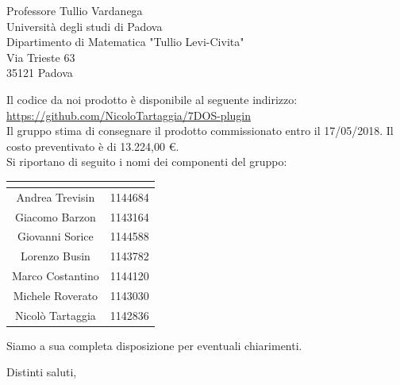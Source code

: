 \begin{letter}{Professore Tullio Vardanega \\ Università degli studi di Padova \\ Dipartimento di Matematica "Tullio Levi-Civita" \\ Via Trieste 63 \\ 35121 Padova}
\begin{addmargin}[2em]{2em}
	Il codice da noi prodotto è disponibile al seguente indirizzo:\\[0.2cm]
	\hspace*{10mm}\url{https://github.com/NicoloTartaggia/7DOS-plugin}\\[0.2cm]
  Il gruppo stima di consegnare il prodotto commissionato entro il 17/05/2018. Il costo preventivato è di 13.224,00 \euro.\\
  
  Si riportano di seguito i nomi dei componenti del gruppo:
\renewcommand{\arraystretch}{2}
\tabcolsep=16mm
	\begin{center}
		\begin{tabular}{| c | c |}
			\hline
			\rowcolor{title_row}
			\textbf{\color{title_text}{Nominativo}} & \textbf{\color{title_text}{Matricola}}\\ \hline
			Andrea Trevisin & 1144684\\ \hline
			Giacomo Barzon & 1143164\\ \hline
			Giovanni Sorice & 1144588\\ \hline
			Lorenzo Busin & 1143782\\ \hline
			Marco Costantino & 1144120\\ \hline
			Michele Roverato & 1143030\\ \hline
			Nicolò Tartaggia & 1142836\\ 
			\hline
		\end{tabular}
	\end{center}
\renewcommand{\arraystretch}{1}

Siamo a sua completa disposizione per eventuali chiarimenti.
\end{addmargin}

\closing{Distinti saluti,}




\end{letter}
 

